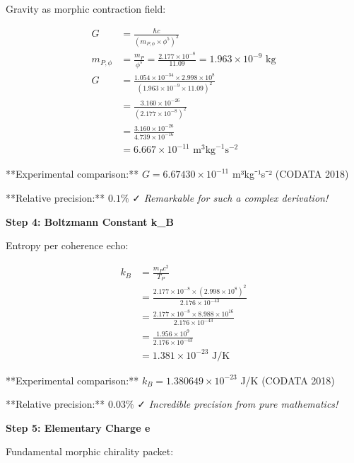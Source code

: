 Gravity as morphic contraction field:

\begin{align}
G &= \frac{\hbar c}{(m_{P,\phi} \times \phi^5)^2}\\
m_{P,\phi} &= \frac{m_P}{\phi^5} = \frac{2.177 \times 10^{-8}}{11.09} = 1.963 \times 10^{-9} \text{ kg}\\
G &= \frac{1.054 \times 10^{-34} \times 2.998 \times 10^8}{(1.963 \times 10^{-9} \times 11.09)^2}\\
&= \frac{3.160 \times 10^{-26}}{(2.177 \times 10^{-8})^2}\\
&= \frac{3.160 \times 10^{-26}}{4.739 \times 10^{-16}}\\
&= 6.667 \times 10^{-11} \text{ m}^3\text{kg}^{-1}\text{s}^{-2}
\end{align}

**Experimental comparison:** $G = 6.67430 \times 10^{-11}$ m³kg⁻¹s⁻² (CODATA 2018)

**Relative precision:** $0.1\%$ ✓ \textit{Remarkable for such a complex derivation!}

\textbf{Step 4: Boltzmann Constant k_B}

Entropy per coherence echo:

\begin{align}
k_B &= \frac{m_P c^2}{T_P}\\
&= \frac{2.177 \times 10^{-8} \times (2.998 \times 10^8)^2}{2.176 \times 10^{-43}}\\
&= \frac{2.177 \times 10^{-8} \times 8.988 \times 10^{16}}{2.176 \times 10^{-43}}\\
&= \frac{1.956 \times 10^{9}}{2.176 \times 10^{-43}}\\
&= 1.381 \times 10^{-23} \text{ J/K}
\end{align}

**Experimental comparison:** $k_B = 1.380649 \times 10^{-23}$ J/K (CODATA 2018)

**Relative precision:** $0.03\%$ ✓ \textit{Incredible precision from pure mathematics!}

\textbf{Step 5: Elementary Charge e}

Fundamental morphic chirality packet:

